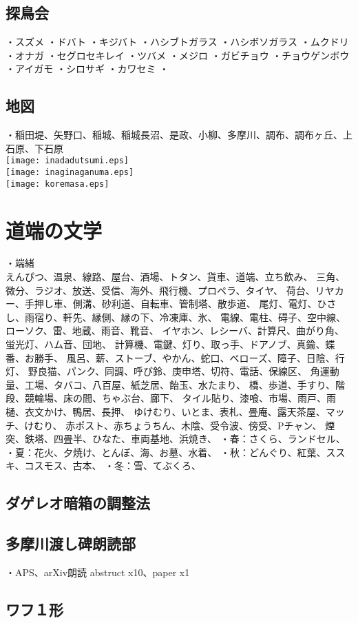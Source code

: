 \documentclass[12pt,a4paper]{jbook}
\begin{document}
\section{探鳥会}
・スズメ
・ドバト
・キジバト
・ハシブトガラス
・ハシボソガラス
・ムクドリ
・オナガ
・セグロセキレイ
・ツバメ
・メジロ
・ガビチョウ
・チョウゲンボウ
・アイガモ
・シロサギ
・カワセミ
・
\section{地図}
・稲田堤、矢野口、稲城、稲城長沼、是政、小柳、多摩川、調布、調布ヶ丘、上石原、下石原
\\
\texttt{[image: inadadutsumi.eps]}
\\
\texttt{[image: inaginaganuma.eps]}
\\
\texttt{[image: koremasa.eps]}
\chapter{道端の文学}
・端緒
\\
えんぴつ、温泉、線路、屋台、酒場、トタン、貨車、道端、立ち飲み、
三角、微分、ラジオ、放送、受信、海外、飛行機、プロペラ、タイヤ、
荷台、リヤカー、手押し車、側溝、砂利道、自転車、管制塔、散歩道、
尾灯、電灯、ひさし、雨宿り、軒先、縁側、縁の下、冷凍庫、氷、
電線、電柱、碍子、空中線、ローソク、雷、地蔵、雨音、靴音、
イヤホン、レシーバ、計算尺、曲がり角、蛍光灯、ハム音、団地、
計算機、電鍵、灯り、取っ手、ドアノブ、真鍮、蝶番、お勝手、
風呂、薪、ストーブ、やかん、蛇口、ベローズ、障子、日陰、行灯、
野良猫、パンク、同調、呼び鈴、庚申塔、切符、電話、保線区、
角運動量、工場、タバコ、八百屋、紙芝居、飴玉、水たまり、
橋、歩道、手すり、階段、競輪場、床の間、ちゃぶ台、廊下、
タイル貼り、漆喰、市場、雨戸、雨樋、衣文かけ、鴨居、長押、
ゆけむり、いとま、表札、畳庵、露天茶屋、マッチ、けむり、
赤ポスト、赤ちょうちん、木陰、受令波、傍受、Pチャン、
煙突、鉄塔、四畳半、ひなた、車両基地、浜焼き、
・春：さくら、ランドセル、
・夏：花火、夕焼け、とんぼ、海、お墓、水着、
・秋：どんぐり、紅葉、ススキ、コスモス、古本、
・冬：雪、てぶくろ、
\section{ダゲレオ暗箱の調整法}
\section{多摩川渡し碑朗読部}
・APS、arXiv朗読
 abstruct x10、paper x1
\section{ワフ１形}
\end{document}
